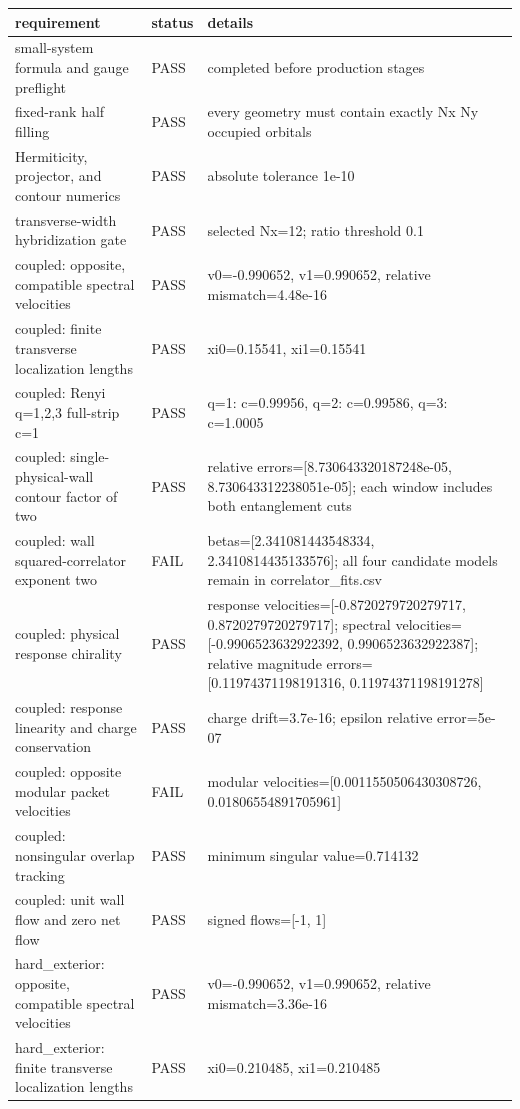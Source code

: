 \documentclass[aps,prb,onecolumn,nofootinbib,superscriptaddress]{revtex4-2}
\begin{document}
\begin{longtable}{p{}p{}p{}}
\toprule
requirement & status & details \\
\midrule
small-system formula and gauge preflight & PASS & completed before production stages \\
fixed-rank half filling & PASS & every geometry must contain exactly Nx Ny occupied orbitals \\
Hermiticity, projector, and contour numerics & PASS & absolute tolerance 1e-10 \\
transverse-width hybridization gate & PASS & selected Nx=12; ratio threshold 0.1 \\
coupled: opposite, compatible spectral velocities & PASS & v0=-0.990652, v1=0.990652, relative mismatch=4.48e-16 \\
coupled: finite transverse localization lengths & PASS & xi0=0.15541, xi1=0.15541 \\
coupled: Renyi q=1,2,3 full-strip c=1 & PASS & q=1: c=0.99956, q=2: c=0.99586, q=3: c=1.0005 \\
coupled: single-physical-wall contour factor of two & PASS & relative errors=[8.730643320187248e-05, 8.730643312238051e-05]; each window includes both entanglement cuts \\
coupled: wall squared-correlator exponent two & FAIL & betas=[2.341081443548334, 2.3410814435133576]; all four candidate models remain in correlator\_fits.csv \\
coupled: physical response chirality & PASS & response velocities=[-0.8720279720279717, 0.8720279720279717]; spectral velocities=[-0.9906523632922392, 0.9906523632922387]; relative magnitude errors=[0.11974371198191316, 0.11974371198191278] \\
coupled: response linearity and charge conservation & PASS & charge drift=3.7e-16; epsilon relative error=5e-07 \\
coupled: opposite modular packet velocities & FAIL & modular velocities=[0.0011550506430308726, 0.01806554891705961] \\
coupled: nonsingular overlap tracking & PASS & minimum singular value=0.714132 \\
coupled: unit wall flow and zero net flow & PASS & signed flows=[-1, 1] \\
hard\_exterior: opposite, compatible spectral velocities & PASS & v0=-0.990652, v1=0.990652, relative mismatch=3.36e-16 \\
hard\_exterior: finite transverse localization lengths & PASS & xi0=0.210485, xi1=0.210485 \\

\end{longtable}
\end{document}
